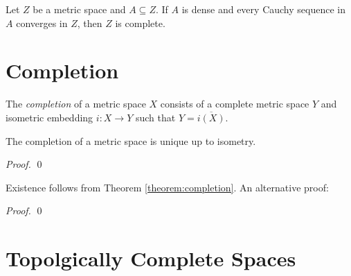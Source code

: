 \begin{proposition}
    Let $Z$ be a metric space and $A \subseteq Z$. If $A$ is dense and every Cauchy sequence in $A$ converges in $Z$,
    then $Z$ is complete.
\end{proposition}

\section{Completion}

\begin{definition}[Completion]
    The \emph{completion} of a metric space $X$ consists of a complete metric space $Y$ and isometric embedding
    $i : X \rightarrow Y$ such that $Y = \overline{i(X)}$.
\end{definition}

\begin{theorem}
    The completion of a metric space is unique up to isometry.
\end{theorem}

\begin{proof}
    \pf
    \qed
\end{proof}

Existence follows from Theorem \ref{theorem:completion}. An alternative proof:

\begin{proof}
    \pf
    \qed
\end{proof}

\section{Topolgically Complete Spaces}

